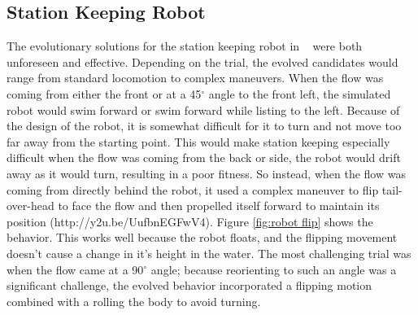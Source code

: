 \documentclass{sig-alternate}
\begin{document}
\subsection{Station Keeping Robot}\label{Moore behavior}
  The evolutionary solutions for the station keeping robot in ~\cite{Moore:2013:ESK:2463372.2463402} were both unforeseen and effective. Depending on the trial, the evolved candidates would range from standard locomotion to complex maneuvers. When the flow was coming from either the front or at a 45$^\circ$ angle to the front left, the simulated robot would swim forward or swim forward while listing to the left. Because of the design of the robot, it is somewhat difficult for it to turn and not move too far away from the starting point. This would make station keeping especially difficult when the flow was coming from the back or side, the robot would drift away as it would turn, resulting in a poor fitness. So instead, when the flow was coming from directly behind the robot, it used a complex maneuver to flip tail-over-head to face the flow and then propelled itself forward to maintain its position (http://y2u.be/UufbnEGFwV4). Figure \ref{fig:robot flip} shows the behavior. This works well because the robot floats, and the flipping movement doesn't cause a change in it's height in the water. The most challenging trial was when the flow came at a 90$^\circ$ angle; because reorienting to such an angle was a significant challenge, the evolved behavior incorporated a flipping motion combined with a rolling the body to avoid turning.
 
\end{document}
